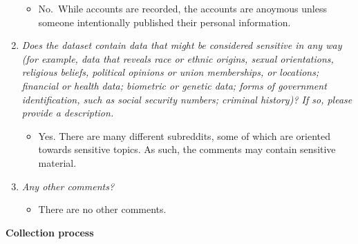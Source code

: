 \documentclass[
]{article}
\providecommand{\tightlist}{%
  \setlength{\itemsep}{0pt}\setlength{\parskip}{0pt}}
\begin{document}
\begin{enumerate}
  \begin{itemize}
  \tightlist
  \item
    No.~While accounts are recorded, the accounts are anoymous unless someone intentionally published their personal information.
  \end{itemize}
\item
  \emph{Does the dataset contain data that might be considered sensitive in any way (for example, data that reveals race or ethnic origins, sexual orientations, religious beliefs, political opinions or union memberships, or locations; financial or health data; biometric or genetic data; forms of government identification, such as social security numbers; criminal history)? If so, please provide a description.}

  \begin{itemize}
  \tightlist
  \item
    Yes. There are many different subreddits, some of which are oriented towards sensitive topics. As such, the comments may contain sensitive material.
  \end{itemize}
\item
  \emph{Any other comments?}

  \begin{itemize}
  \tightlist
  \item
    There are no other comments.
  \end{itemize}
\end{enumerate}

\textbf{Collection process}
\end{document}
